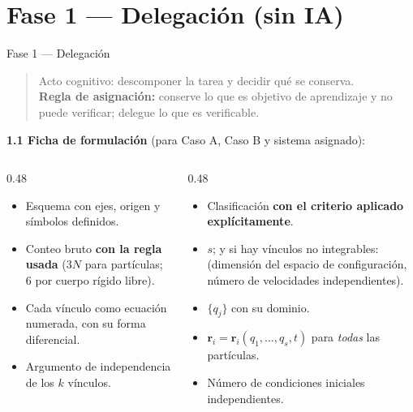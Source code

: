 \documentclass[10pt,aspectratio=169]{beamer}
\newcommand{\rv}{\mathbf{r}}
\begin{document}
\section{Fase 1 --- Delegación (sin IA)}

\begin{frame}{Fase 1 --- Delegación}
  \begin{quote}\small
    Acto cognitivo: descomponer la tarea y decidir qué se conserva.\\
    \textbf{Regla de asignación:} conserve lo que es objetivo de aprendizaje y no puede verificar; delegue lo que es verificable.
  \end{quote}
  \pause
  \textbf{1.1 Ficha de formulación} (para Caso A, Caso B y sistema asignado):
  \begin{columns}[T]
    \begin{column}{0.48\textwidth}
      \small
      \begin{itemize}
        \item Esquema con ejes, origen y símbolos definidos.
        \item Conteo bruto \textbf{con la regla usada} ($3N$ para partículas; $6$ por cuerpo rígido libre).
        \item Cada vínculo como ecuación numerada, con su forma diferencial.
        \item Argumento de independencia de los $k$ vínculos.
      \end{itemize}
    \end{column}
    \begin{column}{0.48\textwidth}
      \small
      \begin{itemize}
        \item Clasificación \textbf{con el criterio aplicado explícitamente}.
        \item $s$; y si hay vínculos no integrables: (dimensión del espacio de configuración, número de velocidades independientes).
        \item $\{q_j\}$ con su dominio.
        \item $\rv_i=\rv_i(q_1,\dots,q_s,t)$ para \emph{todas} las partículas.
        \item Número de condiciones iniciales independientes.
      \end{itemize}
    \end{column}
  \end{columns}
\end{frame}
\end{document}
